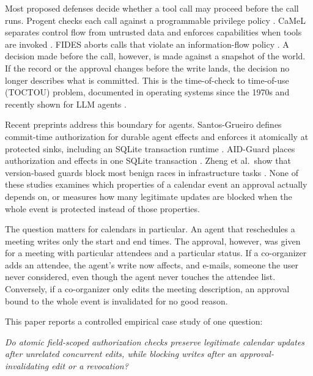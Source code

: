Most proposed defenses decide whether a tool call may proceed before the call runs. Progent checks each call against a programmable privilege policy \cite{progent2025}. CaMeL separates control flow from untrusted data and enforces capabilities when tools are invoked \cite{camel2025}. FIDES aborts calls that violate an information-flow policy \cite{fides2025}. A decision made before the call, however, is made against a snapshot of the world. If the record or the approval changes before the write lands, the decision no longer describes what is committed. This is the time-of-check to time-of-use (TOCTOU) problem, documented in operating systems since the 1970s \cite{mcphee1974,bishop1996} and recently shown for LLM agents \cite{mindthegap2025}.

Recent preprints address this boundary for agents. Santos-Grueiro defines commit-time authorization for durable agent effects and enforces it atomically at protected sinks, including an SQLite transaction runtime \cite{santosgrueiro2026}. AID-Guard places authorization and effects in one SQLite transaction \cite{aidguard2026}. Zheng et al.\ show that version-based guards block most benign races in infrastructure tasks \cite{zheng2026stale}. None of these studies examines which properties of a calendar event an approval actually depends on, or measures how many legitimate updates are blocked when the whole event is protected instead of those properties.

The question matters for calendars in particular. An agent that reschedules a meeting writes only the start and end times. The approval, however, was given for a meeting with particular attendees and a particular status. If a co-organizer adds an attendee, the agent's write now affects, and e-mails, someone the user never considered, even though the agent never touches the attendee list. Conversely, if a co-organizer only edits the meeting description, an approval bound to the whole event is invalidated for no good reason.

This paper reports a controlled empirical case study of one question:

\textit{Do atomic field-scoped authorization checks preserve legitimate calendar updates after unrelated concurrent edits, while blocking writes after an approval-invalidating edit or a revocation?}

